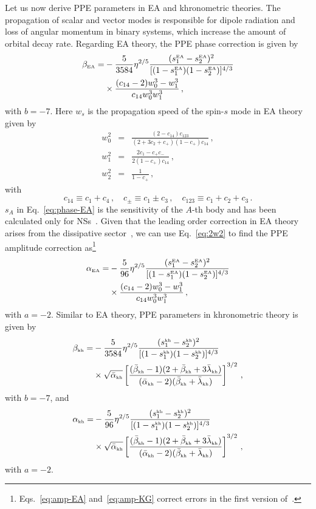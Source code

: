 \documentclass[prd,twocolumn,nofootinbib]{revtex4-1}
\newcommand\be{\begin{equation}}
\newcommand\ba{\begin{eqnarray}}
\newcommand\ee{\end{equation}}
\newcommand\ea{\end{eqnarray}}
\newcommand{\KG}{{\mbox{\tiny kh}}}
\newcommand{\EA}{{\mbox{\tiny EA}}}
\begin{document}
 

Let us now derive PPE parameters in EA and khronometric theories. The propagation of scalar and vector modes is responsible for dipole radiation and loss of angular momentum in binary systems, which increase the amount of orbital decay rate. 
Regarding EA theory, the PPE phase correction is given by~\cite{Hansen:2014ewa} 
 \begin{align}
 \label{eq:phase-EA}
 \beta_{\EA}=&-\frac{5}{3584}\eta ^{2/5} \frac{(s_1^\EA-s_2^\EA)^2}{[(1-s_1^\EA) (1-s_2^\EA)]^{4/3}}\nonumber\\
 & \times \frac{(c_{14}-2) w_0^3-w_1^3}{c_{14} w_0^3 w_1^3}\,,
 \end{align}
with $b=-7$. Here $w_s$ is the propagation speed of the spin-$s$ mode in EA theory given by~\cite{Jacobson:2008aj}  
\ba \label{eq:Prop_Speed_EA_1}
w_0^2 &=& \frac{(2-c_{14}) c_{123}}{(2+3c_2+c_{+}) (1-c_{+}) c_{14}}\,, \\ \label{eq:Prop_Speed_EA_2}
w_1^2 &=& \frac{2 c_1 - c_{+} c_{-}}{2(1-c_{+}) c_{14}}\,, \\  \label{eq:Prop_Speed_EA_3}
w_2^2 &=& \frac{1}{1 - c_+}\,,
\ea
with
\be
c_{14}\equiv c_1+c_4\,, \quad c_{\pm} \equiv c_1 \pm c_3\,, \quad c_{123} \equiv c_1 + c_2 + c_3\,. 
\ee
$s_A$ in Eq.~\eqref{eq:phase-EA} is the sensitivity of the $A$-th body and has been calculated only for NSs~\cite{Yagi:2013ava,Yagi:2013qpa}.
Given that the leading order correction in EA theory arises from the dissipative sector~\cite{Hansen:2014ewa}, we can use Eq.~\eqref{eq:2w2} to find the PPE amplitude correction as\footnote{Eqs.~\eqref{eq:amp-EA} and~\eqref{eq:amp-KG} correct errors in the first version of~\cite{Hansen:2014ewa}.}
 \begin{align}
 \label{eq:amp-EA}
 \alpha_{\EA}=&-\frac{5}{96}\eta ^{2/5} \frac{(s_1^\EA-s_2^\EA)^2}{[ (1-s_1^\EA) (1-s_2^\EA)]^{4/3}} \nonumber\\
 & \times  \frac{(c_{14}-2) w_0^3-w_1^3}{c_{14} w_0^3 w_1^3}\,,
 \end{align}
 with $a=-2$.  Similar to EA theory, PPE parameters in khronometric theory is given by~\cite{Hansen:2014ewa}
 \begin{align}
 \beta_{\KG}=&-\frac{5}{3584}\eta ^{2/5}\frac{(s_1^\KG-s_2^\KG)^2}{[(1-s_1^\KG) (1-s_2^\KG)]^{4/3}} \nonumber\\
 & \times \sqrt{\bar \alpha_{\KG}}\left[\frac{(\bar \beta_{\KG}-1)(2+\bar \beta_{\KG}+3\bar \lambda_{\KG})}{(\bar \alpha_{\KG}-2)(\bar \beta_{\KG}+\bar \lambda_{\KG})}\right]^{3/2}\,,
 \end{align}
 with $b=-7$, and
 \begin{align}
 \label{eq:amp-KG}
 \alpha_{\KG}=&-\frac{5}{96} \eta ^{2/5}\frac{(s_1^\KG-s_2^\KG)^2}{[(1-s_1^\KG) (1-s_2^\KG)]^{4/3}} \nonumber\\
 & \times\sqrt{\bar \alpha_{\KG}} \left[\frac{(\bar \beta_{\KG}-1)(2+\bar \beta_{\KG}+3\bar \lambda_{\KG})}{(\bar \alpha_{\KG}-2)(\bar \beta_{\KG}+\bar \lambda_{\KG})}\right]^{3/2}\,,
 \end{align}
 with $a=-2$.
 
\end{document}
